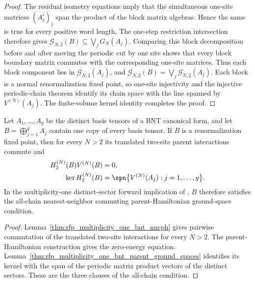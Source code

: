 \begin{proof}\leanok
    The residual isometry equations imply that the simultaneous one-site
    matrices $(A_j^i)_j$ span the product of the block matrix algebras. Hence
    the same is true for every positive word length. The one-step restriction
    intersection therefore gives
    $\mathcal G_{N,2}(B) \subseteq \bigvee_j G_N(A_j)$.
    Comparing this block decomposition before and after moving the periodic
    cut by one site shows that every block boundary matrix commutes with the
    corresponding one-site matrices. Thus each block component lies in
    $\mathcal G_{N,2}(A_j)$, and
    $\mathcal G_{N,2}(B) =\bigvee_j\mathcal G_{N,2}(A_j)$.
    Each block is a normal renormalization fixed point, so one-site
    injectivity and the injective periodic-chain theorem identify its chain
    space with the line spanned by $V^{(N)}(A_j)$. The finite-volume kernel
    identity completes the proof.
\end{proof}

\begin{lemma}%
    \label{thm:rfp_multiplicity_one_bnt_has_nncph_ground_spaces}
    \leanok
    Let $A_1,\ldots,A_g$ be the distinct basis tensors of a BNT canonical
    form, and let $B=\bigoplus_{j=1}^g A_j$ contain one copy of every basis
    tensor. If $B$ is a renormalization fixed point, then for every $N>2$ its
    translated two-site parent interactions commute and
    \begin{align}
        H_2^{(N)}(B)V^{(N)}(B) & =0, \notag                                           \\
        \ker H_2^{(N)}(B)
                               & =\spn\bigl\{V^{(N)}(A_j):j=1,\ldots,g\bigr\}. \notag
    \end{align}
    In the multiplicity-one distinct-sector forward implication of
    \cite[Theorem~3.10]{Cirac2016MPDO_arXiv}, $B$ therefore satisfies the
    all-chain nearest-neighbor commuting parent-Hamiltonian ground-space
    condition.
\end{lemma}

\begin{proof}\leanok
    Lemma~\ref{thm:rfp_multiplicity_one_bnt_nncph} gives pairwise
    commutation of the translated two-site interactions for every $N>2$.
    The parent-Hamiltonian construction gives the zero-energy equation.
    Lemma~\ref{thm:rfp_multiplicity_one_bnt_parent_ground_spaces} identifies
    its kernel with the span of the periodic matrix product vectors of the
    distinct sectors. These are the three clauses of the all-chain condition.
\end{proof}
